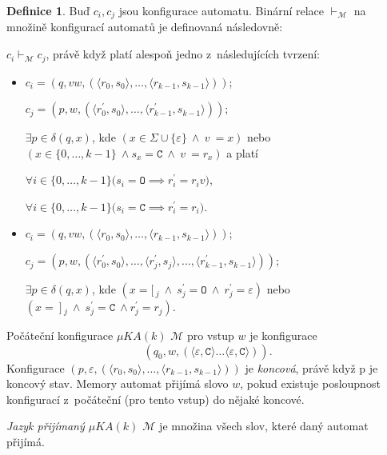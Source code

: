 \documentclass[thesis=B,czech]{FITthesis}[2019/12/23]
\theoremstyle{definition}
\newtheorem{definition}{Definice}[chapter]
\begin{document}
\begin{definition}
	Buď $c_i, c_j$ jsou konfigurace automatu. Binární relace $\vdash_{\mathcal{M}}$ na množině konfigurací automatů je definovaná následovně:
	
	$c_i \vdash_{\mathcal{M}} c_j$, právě když platí alespoň jedno z~následujících tvrzení:
	\begin{itemize}
		\item $c_i=(q, vw,  (\big\langle r_0, s_0\big\rangle, \dots, \big\langle r_{k-1}, s_{k-1}\big\rangle))$;

			 $c_j = (p, w,  (\big\langle r_0^\prime, s_0\big\rangle, \dots, \big\langle r_{k-1}^\prime, s_{k-1}\big\rangle))$;

			 $\exists p \in \delta(q, x)$, kde $(x \in \Sigma \cup \{\varepsilon\} \ \wedge \ v~= x)$ nebo $(x \in \{0,\dots, k-1\} \ \wedge{s_x = \texttt{C} \ \wedge \ v~= r_{x} })$ a platí

			\subitem$\forall i \in \{0, \dots, k-1\} \bigg( s_i = \texttt{O} \implies r_i^\prime = r_i v\bigg)$,

			\subitem $\forall i \in \{0, \dots, k-1\} \bigg( s_i = \texttt{C} \implies r_i^\prime = r_i\bigg)$.
		\item  $c_i=(q, vw,  (\big\langle r_0, s_0\big\rangle, \dots, \big\langle r_{k-1}, s_{k-1}\big\rangle))$;

			 $c_j = (p, w,  (\big\langle r_0^\prime, s_0\big\rangle,  \dots , \big\langle r_{j}^\prime, s_{j}\big\rangle, \dots ,\big\langle r_{k-1}^\prime, s_{k-1}\big\rangle))$;
			
			 $\exists p \in \delta(q, x)$, kde $(x = [\,_j \ \wedge \ s_j^\prime = \texttt{O} \ \wedge \ r_j^\prime = \varepsilon)$ nebo $(x = \ ]\,_j \ \wedge \  {s_j^\prime = \texttt{C} \ \wedge}  {r_j^\prime = r_j})$. \cite{schmidref}
			
			
	\end{itemize}
\end{definition}

Počáteční konfigurace $\mu KA(k)$ $\mathcal{M}$ pro vstup $w$ je konfigurace $$\left(q_0, w, (\langle \varepsilon, \texttt{C} \rangle \dots \langle\varepsilon, \texttt{C}\rangle)\right).$$ Konfigurace ${\left(p, \varepsilon, (\langle r_0, s_0 \rangle, \dots, \langle r_{k-1}, s_{k-1}\rangle)\right)}$ je \emph{koncová}, právě když p je koncový stav. Memory automat {přijímá slovo $w$}, pokud existuje posloupnost konfigurací z~počáteční (pro tento vstup) do nějaké koncové.

\emph{Jazyk přijímaný $\mu KA(k)$ $\mathcal{M}$} je množina všech slov, které daný automat přijímá.
\end{document}
